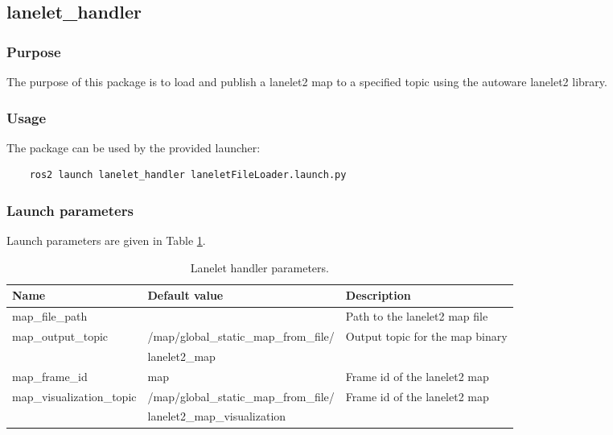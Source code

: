 \documentclass[sn-mathphys-num]{sn-jnl}%
\begin{document}
\subsection{lanelet\_handler}
\subsubsection{Purpose}
The purpose of this package is to load and publish a lanelet2 map to a specified topic using the autoware lanelet2 library.
\subsubsection{Usage}
The package can be used by the provided launcher:
\begin{lstlisting}
    ros2 launch lanelet_handler laneletFileLoader.launch.py
\end{lstlisting}

\subsubsection{Launch parameters}
Launch parameters are given in Table \ref{tab:lanelet_handler}.
\begin{table}[!h]
    \centering
    \captionsetup{justification=centering}
    \normalsize
    \caption{\label{tab:lanelet_handler} Lanelet handler parameters.}
    \begin{tabular}{| l | l | l |}
        \hline
        \textbf{Name} & \textbf{Default value} & \textbf{Description} \\
        \hline
        map\_file\_path           &                                       & Path to the lanelet2 map file \\
        \hline
        map\_output\_topic        & /map/global\_static\_map\_from\_file/ & Output topic for the map binary \\
                                  & lanelet2\_map                         &  \\
        \hline
        map\_frame\_id            & map                                   & Frame id of the lanelet2 map \\
        \hline
        map\_visualization\_topic & /map/global\_static\_map\_from\_file/ & Frame id of the lanelet2 map \\
                                  & lanelet2\_map\_visualization          &  \\
        \hline
    \end{tabular}
\end{table}

\end{document}
